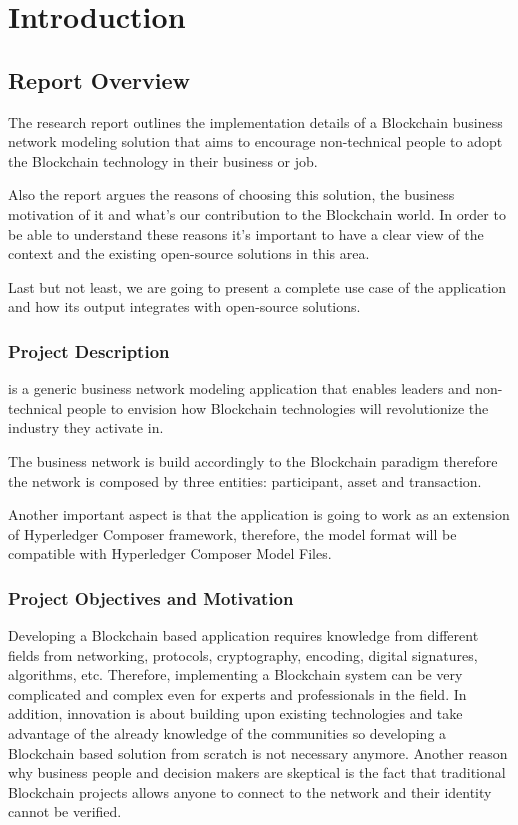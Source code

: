 \chapter{Introduction}
\label{chapter:intro}

\section{Report Overview}
\label{sec:intro-section1}
The research report outlines the implementation details of a Blockchain business network modeling solution that aims to encourage non-technical people to adopt the Blockchain technology in their business or job.

Also the report argues the reasons of choosing this solution, the business motivation of it and what's our contribution to the Blockchain world.
In order to be able to understand these reasons it's important to have a clear view of the context and the existing open-source solutions in this area. 

Last but not least, we are going to present a complete use case of the application and how its output integrates with open-source solutions.

\subsection{Project Description}
\label{sub-sec:intro-subsection1}
\textbf{\project} is a generic business network modeling application that enables leaders and non-technical people to envision how Blockchain technologies will revolutionize the industry they activate in.

The business network is build accordingly to the Blockchain paradigm therefore the network is composed by three entities: participant, asset and transaction.

Another important aspect is that the application is going to work as an extension of Hyperledger Composer framework, therefore, the model format will be compatible with Hyperledger Composer Model Files.

\subsection{Project Objectives and Motivation}
\label{sub-sec:intro-subsection2}
Developing a Blockchain based application requires knowledge from different fields from networking, protocols, cryptography, encoding, digital signatures, algorithms, etc. Therefore, implementing a Blockchain system can be very complicated and complex even for experts and professionals in the field.
In addition, innovation is about building upon existing technologies and take advantage of the already knowledge of the communities so developing a Blockchain based solution from scratch is not necessary anymore. 
Another reason why business people and decision makers are skeptical is the fact that traditional Blockchain projects allows anyone to connect to the network and their identity cannot be verified. 

